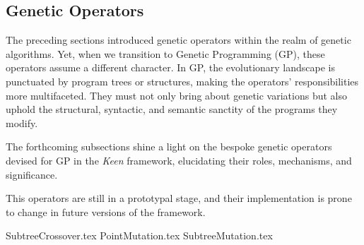 \subsection{Genetic Operators}
\label{sec:keen:gp:op}
  The preceding sections introduced genetic operators within the realm of genetic 
  algorithms. Yet, when we transition to Genetic Programming (GP), these operators 
  assume a different character. In GP, the evolutionary landscape is punctuated by 
  program trees or structures, making the operators' responsibilities more 
  multifaceted. They must not only bring about genetic variations but also uphold 
  the structural, syntactic, and semantic sanctity of the programs they modify.

  The forthcoming subsections shine a light on the bespoke genetic operators 
  devised for GP in the \textit{Keen} framework, elucidating their roles, 
  mechanisms, and significance.

  \begin{remark}
    This operators are still in a prototypal stage, and their implementation
    is prone to change in future versions of the framework.
  \end{remark}

  {SubtreeCrossover.tex}
  {PointMutation.tex}
  {SubtreeMutation.tex}
  